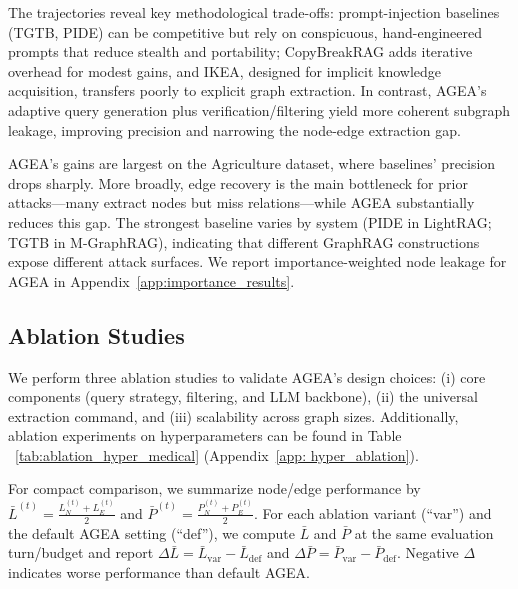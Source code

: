 The trajectories reveal key methodological trade-offs: prompt-injection baselines (TGTB, PIDE) can be competitive but rely on conspicuous, hand-engineered prompts that reduce stealth and portability; 
CopyBreakRAG adds iterative overhead for modest gains, and IKEA, designed for implicit knowledge acquisition, transfers poorly to explicit graph extraction. 
In contrast, AGEA’s adaptive query generation plus verification/filtering yield more coherent subgraph leakage, improving precision and narrowing the node-edge extraction gap.

AGEA’s gains are largest on the Agriculture dataset, where baselines’ precision drops sharply. More broadly, edge recovery is the main bottleneck for prior attacks—many extract nodes but miss relations—while AGEA substantially reduces this gap. The strongest baseline varies by system (PIDE in LightRAG; TGTB in M-GraphRAG), indicating that different GraphRAG constructions expose different attack surfaces.
We report importance-weighted node leakage for AGEA in Appendix~\ref{app:importance_results}.



\subsection{Ablation Studies}
\label{sec:ablation}
We perform three ablation studies to validate AGEA’s design choices: (i) core components (query strategy, filtering, and LLM backbone), (ii) the universal extraction command, and (iii) scalability across graph sizes. Additionally, ablation experiments on hyperparameters can be found in Table ~\ref{tab:ablation_hyper_medical} (Appendix~\ref{app: hyper_ablation}).

For compact comparison, we summarize node/edge performance by $\bar{L}^{(t)}=\frac{L_N^{(t)}+L_E^{(t)}}{2}$ and $\bar{P}^{(t)}=\frac{P_N^{(t)}+P_E^{(t)}}{2}$. For each ablation variant (“var”) and the default AGEA setting (“def”), we compute $\bar{L}$ and $\bar{P}$ at the same evaluation turn/budget and report $\Delta\bar{L}=\bar{L}_{\text{var}}-\bar{L}_{\text{def}}$ and $\Delta\bar{P}=\bar{P}_{\text{var}}-\bar{P}_{\text{def}}$.
Negative $\Delta$ indicates worse performance than default AGEA.

